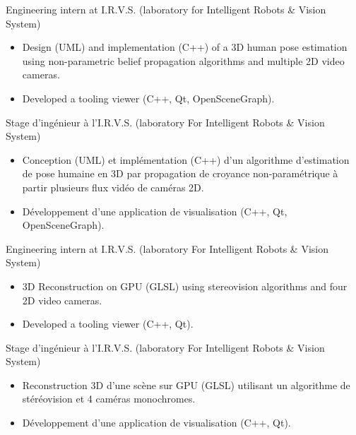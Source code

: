 \documentclass{article}
\begin{document}
\begin{llist}
 {
Engineering intern at I.R.V.S. (laboratory for Intelligent Robots \& Vision System)
\vspace{-0.33cm}
\begin{itemize}
	\item Design (UML) and implementation (C++) of a
		3D human pose estimation using non-parametric belief propagation
		algorithms and multiple 2D video cameras.
	\item Developed a tooling viewer (C++, Qt, OpenSceneGraph).
\end{itemize}
} {
Stage d'ing\'{e}nieur \`{a} l'I.R.V.S. (laboratory For Intelligent Robots \& Vision System)
\vspace{-0.33cm}
\begin{itemize}
	\item Conception (UML) et impl\'{e}mentation (C++) d'un algorithme
		d'estimation de pose humaine en 3D par propagation de croyance
		non-param\'{e}trique \`{a} partir plusieurs flux vid\'{e}o de cam\'{e}ras 2D.
	\item D\'{e}veloppement d'une application de visualisation (C++, Qt, OpenSceneGraph).
\end{itemize}
}

 {
Engineering intern at I.R.V.S. (laboratory For Intelligent Robots \& Vision System)
\vspace{-0.33cm}
\begin{itemize}
	\item 3D Reconstruction on GPU (GLSL) using stereovision algorithms and four 2D video cameras.
	\item Developed a tooling viewer (C++, Qt).
\end{itemize}
} {
Stage d'ing\'{e}nieur \`{a} l'I.R.V.S. (laboratory For Intelligent Robots \& Vision System)
\vspace{-0.33cm}
\begin{itemize}
	\item Reconstruction 3D d'une sc\`{e}ne sur GPU (GLSL) utilisant un algorithme
		de st\'{e}r\'{e}ovision et 4 cam\'{e}ras monochromes.
	\item D\'{e}veloppement d'une application de visualisation (C++, Qt).
\end{itemize}
}


\end{llist}
\end{document}

